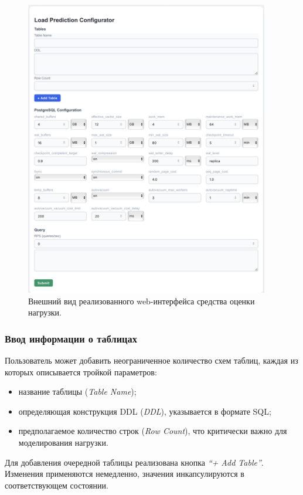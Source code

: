 \begin{figure}[H]
    \centering
    \includegraphics[width=0.95\textwidth]{images/interface.png}
    \caption{Внешний вид реализованного web-интерфейса средства оценки нагрузки.}
    \label{img:interface}
\end{figure}

\subsubsection{Ввод информации о таблицах}

Пользователь может добавить неограниченное количество схем таблиц, каждая из которых описывается тройкой параметров:
\begin{itemize}
    \item название таблицы (\emph{Table Name});
    \item определяющая конструкция DDL (\emph{DDL}), указывается в формате SQL;
    \item предполагаемое количество строк (\emph{Row Count}), что критически важно для моделирования нагрузки.
\end{itemize}
Для добавления очередной таблицы реализована кнопка \emph{``+ Add Table''}. Изменения применяются немедленно, значения инкапсулируются в соответствующем состоянии.

